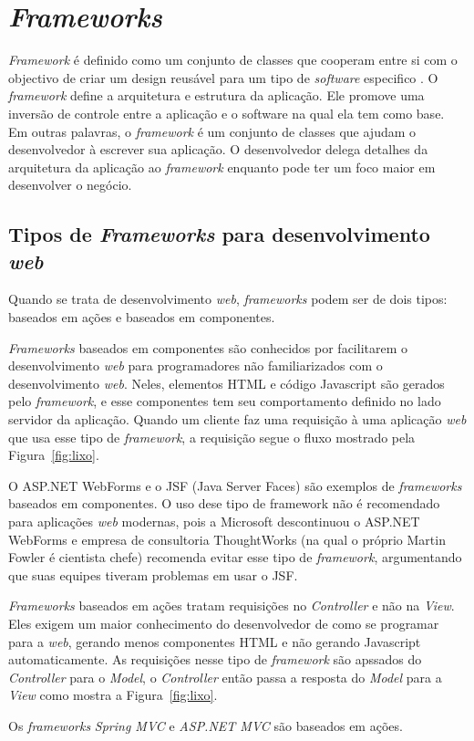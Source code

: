 \section{\textit{Frameworks}}

\textit{Framework} é definido como um conjunto de classes que cooperam entre si com o objectivo de criar um design reusável para um tipo de \textit{software} especifico \citep{28}.
O \textit{framework} define a arquitetura e estrutura da aplicação. Ele promove uma inversão de controle entre a aplicação e o software na qual ela tem como base. 
Em outras palavras, o \textit{framework} é um conjunto de classes que ajudam o desenvolvedor à escrever sua aplicação. 
O desenvolvedor delega detalhes da arquitetura da aplicação ao \textit{framework} enquanto pode ter um foco maior em desenvolver o negócio.

\subsection{Tipos de \textit{Frameworks} para desenvolvimento \textit{web}}

Quando se trata de desenvolvimento \textit{web}, \textit{frameworks} podem ser de dois tipos: baseados em ações e baseados em componentes.

\textit{Frameworks} baseados em componentes são conhecidos por facilitarem o desenvolvimento \textit{web} para programadores não familiarizados com o desenvolvimento \textit{web}. 
Neles, elementos HTML e código Javascript são gerados pelo \textit{framework}, e esse componentes tem seu comportamento definido no lado servidor da aplicação.
Quando um cliente faz uma requisição à uma aplicação \textit{web} que usa esse tipo de \textit{framework}, a requisição segue o fluxo mostrado pela Figura~\ref{fig:lixo}.


O ASP.NET WebForms e o JSF (Java Server Faces) são exemplos de \textit{frameworks} baseados em componentes. O uso dese tipo de framework não é recomendado para aplicações \textit{web} modernas, 
pois a Microsoft descontinuou o ASP.NET WebForms e empresa de consultoria ThoughtWorks (na qual o próprio Martin Fowler é cientista chefe) recomenda evitar esse tipo de \textit{framework}, 
argumentando que suas equipes tiveram problemas em usar o JSF.

\textit{Frameworks} baseados em ações tratam requisições no \textit{Controller} e não na \textit{View}. 
Eles exigem um maior conhecimento do desenvolvedor de como se programar para a \textit{web}, gerando menos componentes HTML e não gerando Javascript automaticamente. 
As requisições nesse tipo de \textit{framework} são apssados do \textit{Controller} para o \textit{Model}, o \textit{Controller} então passa a resposta do \textit{Model} para a \textit{View} como mostra a Figura~\ref{fig:lixo}.


Os \textit{frameworks} \textit{Spring MVC} e \textit{ASP.NET MVC} são baseados em ações.
